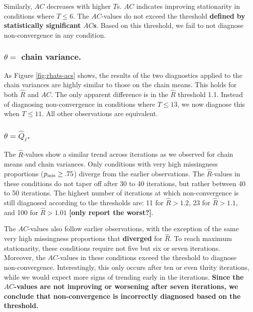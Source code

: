 \documentclass[Royal,times,sageh]{sagej}
\begin{document}
Similarly, \(AC\) decreases with higher \(T\)s. \(AC\) indicates improving stationarity in conditions where \(T\leq6\). The \(AC\)-values do not exceed the threshold \textbf{defined by statistically significant \(AC\)s}. Based on this threshold, we fail to not diagnose non-convergence in any condition.

\hypertarget{theta-chain-variance.}{%
\subsubsection{\texorpdfstring{\(\theta=\) chain variance.}{\textbackslash theta= chain variance.}}\label{theta-chain-variance.}}

As Figure \ref{fig:rhats-acs} shows, the results of the two diagnostics applied to the chain variances are highly similar to those on the chain means. This holds for both \(\widehat{R}\) and \(AC\). The only apparent difference is in the \(\widehat{R}\) threshold 1.1. Instead of diagnosing non-convergence in conditions where \(T\leq13\), we now diagnose this when \(T\leq11\). All other observations are equivalent.

\hypertarget{thetahatq_ell.}{%
\subsubsection{\texorpdfstring{\(\theta=\hat{Q}_\ell\).}{\textbackslash theta=\textbackslash hat\{Q\}\_\textbackslash ell.}}\label{thetahatq_ell.}}

The \(\widehat{R}\)-values show a similar trend across iterations as we observed for chain means and chain variances. Only conditions with very high missingness proportions (\(p_{\rm mis}\geq.75\)) diverge from the earlier observations. The \(\widehat{R}\)-values in these conditions do not taper off after 30 to 40 iterations, but rather between 40 to 50 iterations. The highest number of iterations at which non-convergence is still diagnosed according to the thresholds are: 11 for \(\widehat{R}>1.2\), 23 for \(\widehat{R}>1.1\), and 100 for \(\widehat{R}>1.01\) \textbf{{[}only report the worst?{]}}.

The \(AC\)-values also follow earlier observations, with the exception of the same very high missingness proportions that \textbf{diverged} for \(\widehat{R}\). To reach maximum stationarity, these conditions require not five but six or seven iterations. Moreover, the \(AC\)-values in these conditions exceed the threshold to diagnose non-convergence. Interestingly, this only occurs after ten or even thrity iterations, while we would expect more signs of trending early in the iterations. \textbf{Since the \(AC\)-values are not improving or worsening after seven iterations, we conclude that non-convergence is incorrectly diagnosed based on the threshold.}
\end{document}
